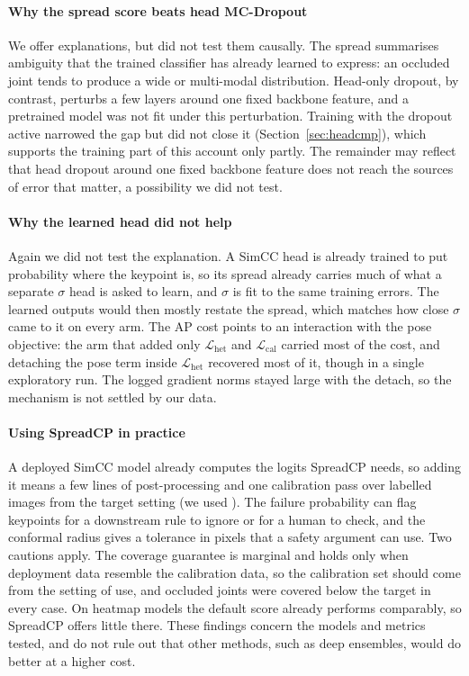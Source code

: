 \documentclass[preprint,11pt]{elsarticle}
\newcommand{\method}{SpreadCP}
\begin{document}
\paragraph{Why the spread score beats head MC-Dropout} We offer explanations, but did not test them
causally. The spread summarises ambiguity that the trained classifier has already learned to express:
an occluded joint tends to produce a wide or multi-modal distribution. Head-only dropout, by contrast,
perturbs a few layers around one fixed backbone feature, and a pretrained model was not fit under this
perturbation. Training with the dropout active narrowed the gap but did not close it
(Section~\ref{sec:headcmp}), which supports the training part of this account only partly. The remainder may reflect
that head dropout around one fixed backbone feature does not reach the sources of error that matter,
a possibility we did not test.

\paragraph{Why the learned head did not help} Again we did not test the explanation. A SimCC head is
already trained to put probability where the keypoint is, so its spread already carries much of what a
separate $\sigma$ head is asked to learn, and $\sigma$ is fit to the same training errors. The learned
outputs would then mostly restate the spread, which matches how close $\sigma$ came to it on every arm.
The AP cost points to an interaction with the pose objective: the arm that added only
$\mathcal{L}_{\text{het}}$ and $\mathcal{L}_{\text{cal}}$ carried most of the cost, and detaching the pose
term inside $\mathcal{L}_{\text{het}}$ recovered most of it, though in a single exploratory run. The
logged gradient norms stayed large with the detach, so the mechanism is not settled by our data.

\paragraph{Using \method{} in practice} A deployed SimCC model already computes the logits \method{}
needs, so adding it means a few lines of post-processing and one calibration pass over labelled images
from the target setting (we used \numCalImages{}). The failure probability can flag keypoints for a downstream
rule to ignore or for a human to check, and the conformal radius gives a tolerance in pixels that a
safety argument can use. Two cautions apply. The coverage guarantee is marginal and holds only when
deployment data resemble the calibration data, so the calibration set should come from the setting of
use, and occluded joints were covered below the target in every case. On heatmap models the default
score already performs comparably, so \method{} offers little there. These findings concern the models
and metrics tested, and do not rule out that other methods, such as deep ensembles, would do better at
a higher cost.
\end{document}
